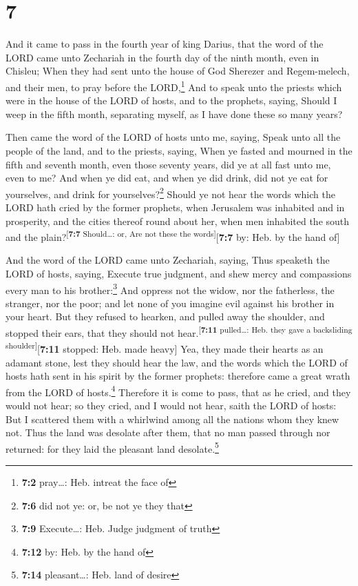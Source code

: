 \hypertarget{section-6}{%
\section{7}\label{section-6}}

 And it came to pass in the fourth year of king Darius,
that the word of the LORD came unto Zechariah in the fourth day of the
ninth month, even in Chisleu;  When they had sent unto the
house of God Sherezer and Regem-melech, and their men, to pray before
the LORD,\footnote{\textbf{7:2} pray\ldots: Heb. intreat the face of}
 And to speak unto the priests which were in the house of
the LORD of hosts, and to the prophets, saying, Should I weep in the
fifth month, separating myself, as I have done these so many years?

 Then came the word of the LORD of hosts unto me, saying,
 Speak unto all the people of the land, and to the
priests, saying, When ye fasted and mourned in the fifth and seventh
month, even those seventy years, did ye at all fast unto me, even to me?
 And when ye did eat, and when ye did drink, did not ye
eat for yourselves, and drink for yourselves?\footnote{\textbf{7:6} did
  not ye: or, be not ye they that}  Should ye not hear the
words which the LORD hath cried by the former prophets, when Jerusalem
was inhabited and in prosperity, and the cities thereof round about her,
when men inhabited the south and the
plain?\textsuperscript{{[}\textbf{7:7} Should\ldots: or, Are not these
the words{]}}{[}\textbf{7:7} by: Heb. by the hand of{]}

 And the word of the LORD came unto Zechariah, saying,
 Thus speaketh the LORD of hosts, saying, Execute true
judgment, and shew mercy and compassions every man to his
brother:\footnote{\textbf{7:9} Execute\ldots: Heb. Judge judgment of
  truth}  And oppress not the widow, nor the fatherless,
the stranger, nor the poor; and let none of you imagine evil against his
brother in your heart.  But they refused to hearken, and
pulled away the shoulder, and stopped their ears, that they should not
hear.\textsuperscript{{[}\textbf{7:11} pulled\ldots: Heb. they gave a
backsliding shoulder{]}}{[}\textbf{7:11} stopped: Heb. made heavy{]}
 Yea, they made their hearts as an adamant stone, lest
they should hear the law, and the words which the LORD of hosts hath
sent in his spirit by the former prophets: therefore came a great wrath
from the LORD of hosts.\footnote{\textbf{7:12} by: Heb. by the hand of}
 Therefore it is come to pass, that as he cried, and they
would not hear; so they cried, and I would not hear, saith the LORD of
hosts:  But I scattered them with a whirlwind among all
the nations whom they knew not. Thus the land was desolate after them,
that no man passed through nor returned: for they laid the pleasant land
desolate.\footnote{\textbf{7:14} pleasant\ldots: Heb. land of desire}

